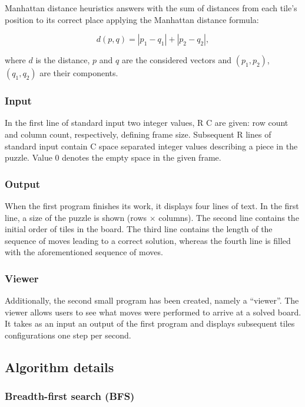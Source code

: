 \documentclass[12pt]{article}
\begin{document}
Manhattan distance heuristics answers with the sum of distances from each tile's position to its correct place applying the Manhattan distance formula:

\[
    d(p, q) = |p_1 - q_1| + |p_2 - q_2|,
\]

where $d$ is the distance, $p$ and $q$ are the considered vectors and $(p_1, p_2)$, $(q_1, q_2)$ are their components.

\subsubsection{Input}

In the first line of standard input two integer values, R C are given: row count and column count, respectively, defining frame size. Subsequent R lines of standard input contain C space separated integer values describing a piece in the puzzle. Value 0 denotes the empty space in the given frame.

\subsubsection{Output}

When the first program finishes its work, it displays four lines of text. In the first line, a size of the puzzle is shown (rows $\times$ columns). The second line contains the initial order of tiles in the board. The third line contains the length of the sequence of moves leading to a correct solution, whereas the fourth line is filled with the aforementioned sequence of moves.

\subsubsection{Viewer}

Additionally, the second small program has been created, namely a ``viewer''. The viewer allows users to see what moves were performed to arrive at a solved board. It takes as an input an output of the first program and displays subsequent tiles configurations one step per second.

\subsection {Algorithm details}

\subsubsection{Breadth-first search (BFS)}
\end{document}
